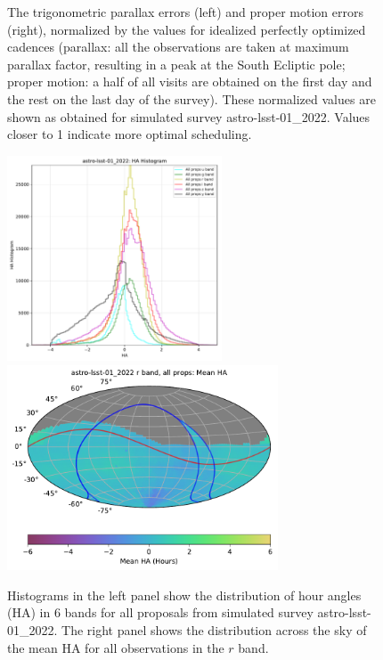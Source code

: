 \documentclass[DM,lsstdraft,authoryear,toc]{lsstdoc}
\begin{document}
\begin{figure}[htb]
\caption{The trigonometric parallax errors (left) and proper motion errors (right), normalized
by the values for idealized perfectly optimized cadences (parallax: all the observations are taken
at maximum parallax factor, resulting in a peak at the South Ecliptic pole; proper motion:
a half of all visits are obtained on the first day and the rest on the last day of the survey). These normalized values are shown as
obtained for simulated survey astro-lsst-01\_2022. Values closer to 1 indicate more optimal scheduling.
\label{fig:baseline_parapm}}
\end{figure}


\begin{figure}[htb]
\centering
\includegraphics[height=2.4in]{figures/astro-lsst-01_2022-ha_hist_per_filter.pdf}
\includegraphics[height=2.4in]{figures/astro-lsst-01_2022_Mean_HA_r_band_all_props_OPSI_SkyMap.pdf}
\caption{Histograms in the left panel show the distribution of hour angles (HA) in
6 bands for all proposals from simulated survey astro-lsst-01\_2022.
The right panel shows the distribution across the sky of the mean HA for
all observations in the $r$ band. 
\label{fig:baseline_ha}}
\end{figure}
\end{document}
